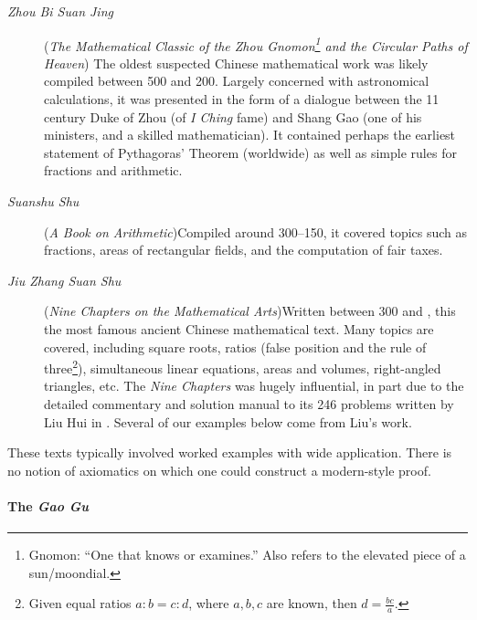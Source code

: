\begin{description}
	\item[\normalfont\emph{Zhou Bi Suan Jing}] (\emph{The Mathematical Classic of the Zhou Gnomon\footnote{Gnomon: ``One that knows or examines.'' Also refers to the elevated piece of a sun/moondial.} and the Circular Paths of Heaven})\newline
The oldest suspected Chinese mathematical work was likely compiled between 500 and 200\BC. Largely concerned with astronomical calculations, it was presented in the form of a dialogue between the 11\th{} century Duke of Zhou (of \emph{I Ching} fame) %
and Shang Gao (one of his ministers, and a skilled mathematician). It contained perhaps the earliest statement of Pythagoras' Theorem (worldwide) as well as simple rules for fractions and arithmetic.

	\item[\normalfont \emph{Suanshu Shu}] (\emph{A Book on Arithmetic})\lstsp Compiled around 300--150\BC, it covered topics such as fractions, areas of rectangular fields, and the computation of fair taxes.

	\item[\normalfont \emph{Jiu Zhang Suan Shu}] (\emph{Nine Chapters on the Mathematical Arts})\lstsp Written between 300\BC{} and , this the most famous ancient Chinese mathematical text. Many topics are covered, including square roots, ratios (false position and the rule of three\footnote{Given equal ratios $a:b=c:d$, where $a,b,c$ are known, then $d=\frac{bc}a$.}), simultaneous linear equations, areas and volumes, right-angled triangles, etc. The \emph{Nine Chapters} was hugely influential, in part due to the detailed commentary and solution manual to its 246 problems written by Liu Hui in . Several of our examples below come from Liu's work. 
\end{description}

These texts typically involved worked examples with wide application. There is no notion of axiomatics on which one could construct a modern-style proof.

\paragraph{The \emph{Gao Gu}}

